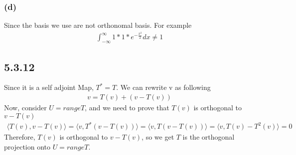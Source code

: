 \documentclass{article}
\begin{document}
\subsubsection*{(d)}
Since the basis we use are not orthonomal basis. For example
\begin{equation*}
    \begin{split}
        \int_{- \infty}^{\infty} 1 * 1 * e^{- \frac{x^2}{2}}dx \neq 1 
    \end{split}
\end{equation*}

\subsection*{5.3.12}
Since it is a self adjoint Map, $T^* = T$.
We can rewrite v as following
\begin{equation*}
    \begin{split}
        v = T(v) + (v-T(v))
    \end{split}
\end{equation*}
Now, consider $U = rangeT$, and we need to prove that $T(v)$ is orthogonal to $v-T(v)$
\begin{equation*}
    \begin{split}
        \langle T(v), v-T(v) \rangle = \langle v, T^*(v-T(v)) \rangle = \langle v, T(v-T(v)) \rangle
        = \langle v, T(v)-T^2(v) \rangle = 0
    \end{split}
\end{equation*}
Therefore, $T(v)$ is orthogonal to $v-T(v)$, so we get $T$ is the orthogonal
projection onto $U = range T$.
\end{document}
